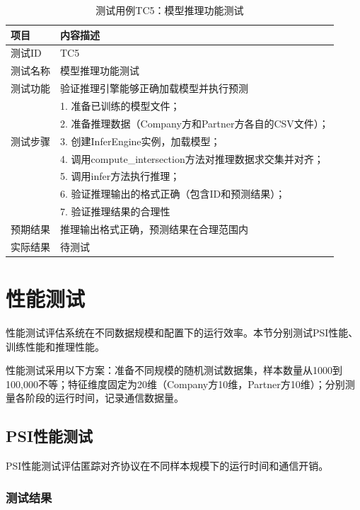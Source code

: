 \begin{table}[htbp]
    \centering
    \caption{测试用例TC5：模型推理功能测试}
    \label{tab:tc5-infer}
    \begin{tabular}{lp{9cm}}
        \toprule
        \textbf{项目} & \textbf{内容描述} \\
        \midrule
        测试ID & TC5 \\
        测试名称 & 模型推理功能测试 \\
        测试功能 & 验证推理引擎能够正确加载模型并执行预测 \\
        \midrule
        \multirow{5}{*}{测试步骤} & 1. 准备已训练的模型文件； \\
        & 2. 准备推理数据（Company方和Partner方各自的CSV文件）； \\
        & 3. 创建InferEngine实例，加载模型； \\
        & 4. 调用compute\_intersection方法对推理数据求交集并对齐； \\
        & 5. 调用infer方法执行推理； \\
        & 6. 验证推理输出的格式正确（包含ID和预测结果）； \\
        & 7. 验证推理结果的合理性 \\
        \midrule
        预期结果 & 推理输出格式正确，预测结果在合理范围内 \\
        实际结果 & 待测试 \\
        \bottomrule
    \end{tabular}
\end{table}

\section{性能测试}
\label{sec:perf-test}

性能测试评估系统在不同数据规模和配置下的运行效率。本节分别测试PSI性能、训练性能和推理性能。

性能测试采用以下方案：准备不同规模的随机测试数据集，样本数量从1000到100,000不等；特征维度固定为20维（Company方10维，Partner方10维）；分别测量各阶段的运行时间，记录通信数据量。

\subsection{PSI性能测试}

PSI性能测试评估匿踪对齐协议在不同样本规模下的运行时间和通信开销。

\subsubsection{测试结果}

